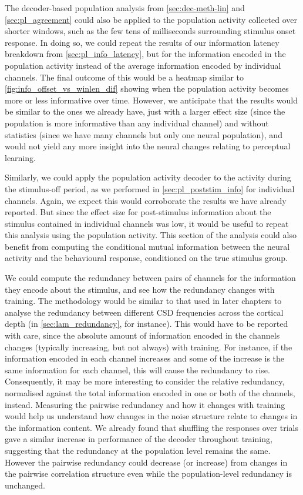 The decoder-based population analysis from \autoref{sec:dec-meth-lin} and \autoref{sec:pl_agreement} could also be applied to the population activity collected over shorter windows, such as the few tens of milliseconds surrounding stimulus onset response.
In doing so, we could repeat the results of our information latency breakdown from \autoref{sec:pl_info_latency}, but for the information encoded in the population activity instead of the average information encoded by individual channels.
The final outcome of this would be a heatmap similar to \autoref{fig:info_offset_vs_winlen_dif} showing when the population activity becomes more or less informative over time.
However, we anticipate that the results would be similar to the ones we already have, just with a larger effect size (since the population is more informative than any individual channel) and without statistics (since we have many channels but only one neural population), and would not yield any more insight into the neural changes relating to perceptual learning.

Similarly, we could apply the population activity decoder to the activity during the stimulus-off period, as we performed in \autoref{sec:pl_poststim_info} for individual channels.
Again, we expect this would corroborate the results we have already reported.
But since the effect size for post-stimulus information about the stimulus contained in individual channels was low, it would be useful to repeat this analysis using the population activity.
This section of the analysis could also benefit from computing the conditional mutual information between the neural activity and the behavioural response, conditioned on the true stimulus group.

We could compute the redundancy between pairs of channels for the information they encode about the stimulus, and see how the redundancy changes with training.
The methodology would be similar to that used in later chapters to analyse the redundancy between different \ac{CSD} frequencies across the cortical depth (in \autoref{sec:lam_redundancy}, for instance).
This would have to be reported with care, since the absolute amount of information encoded in the channels changes (typically increasing, but not always) with training.
For instance, if the information encoded in each channel increases and some of the increase is the same information for each channel, this will cause the redundancy to rise.
Consequently, it may be more interesting to consider the relative redundancy, normalised against the total information encoded in one or both of the channels, instead.
Measuring the pairwise redundancy and how it changes with training would help us understand how changes in the noise structure relate to changes in the information content.
We already found that shuffling the responses over trials gave a similar increase in performance of the decoder throughout training, suggesting that the redundancy at the population level remains the same.
However the pairwise redundancy could decrease (or increase) from changes in the pairwise correlation structure even while the population-level redundancy is unchanged.

